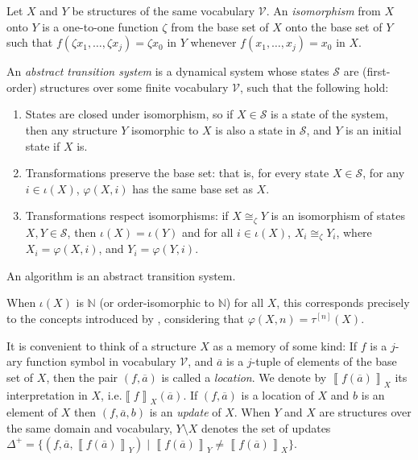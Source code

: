 \documentclass[envcountsame]{llncs}
\newcommand{\St}{\ensuremath{\mathcal {S}}}
\newcommand{\N}{\ensuremath{\mathbb{N}}}
\newcommand{\U}{\ensuremath{\mathcal {V}}}
\newcommand{\evaluation}[2][]{\ensuremath{\left\llbracket #2\right\rrbracket_{#1}}}
\newcommand{\val}[2]{\evaluation[#2]{#1}}
\newcommand{\vall}[2]{\val{#2}{#1}}
\newcommand{\update}[3]{(#1,#2,#3)}\spnewtheorem{postulate}{Postulate}{\bfseries}{\itshape}
\newcommand\LOCATION[2]{(#1,#2)}
\begin{document}
Let $X$ and $Y$ be structures of the same vocabulary $\U$. An
\emph{isomorphism} from $X$ onto $Y$ is a one-to-one function $\zeta$
from the base set of $X$ onto the base set of $Y$ such that $f(\zeta
x_1,\dots,\zeta x_j)= \zeta x_0$ in $Y$ whenever $f(x_1,\dots,x_j)=x_0$
in $X$.


\begin{definition}\label{ATS}
An \emph{abstract transition system} is a dynamical system
whose states $\St$ are (first-order) structures over some finite vocabulary $\U$,
such that the following hold:
\begin{enumerate}
\item States are closed under isomorphism, so if $X\in \St$ is a state of the system, then any structure $Y$ isomorphic to $X$ is also a state in $\St$, and $Y$ is an initial state if $X$ is.
\item Transformations preserve the base set: that is, for every state $X \in \St$, for any $i \in \iota(X)$, $\varphi(X,i)$ has the same base set as $X$.




\item Transformations respect isomorphisms:   if $X\cong_\zeta Y$
  is an isomorphism of states $X,Y\in \St$,  then
$\iota(X)=\iota(Y)$
   and for all $i \in \iota(X)$, $X_i \cong_\zeta Y_i$,
    where $X_i = \varphi(X,i)$, and $Y_i=\varphi(Y,i)$.


\end{enumerate}
\end{definition}

\begin{postulatep} \label{postulateats} An
  algorithm is an abstract
  transition system.
\end{postulatep}

When $\iota(X)$ is $\N$ (or order-isomorphic to $\N$) for all $X$, this corresponds precisely to the concepts
 introduced by \cite{Gur00}, considering that $\varphi(X,n) =
 \tau^{[n]}(X)$.






It is convenient to think of a structure $X$ as a memory of some kind: If
$f$ is a $j$-ary function symbol in vocabulary $\U$, and
$\overline{a}$ is a $j$-tuple of elements of the base set of $X$, then
the pair $\LOCATION{f}{\overline{a}}$ is called a
\emph{location}. We denote by $\vall{X}{f(\overline{a})}$ its interpretation
in $X$, i.e.\@ $\val{f}{X}(\overline{a})$.
If $\LOCATION{f}{\overline{a}}$ is a
location of $X$ and $b$ is an element of $X$ then
$\update{f}{\overline{a}}{b}$ is an \emph{update} of $X$.
When $Y$ and $X$ are structures over the same domain and vocabulary,
$Y\setminus X$ denotes the set of updates $\Delta^+=
\{ \update{f}{\overline{a}}{\vall{Y}{f(\overline{a})}}  \mid  \vall{Y}{f(\overline{a})} \neq  \vall{X}{f(\overline{a})}\}.$
\end{document}
